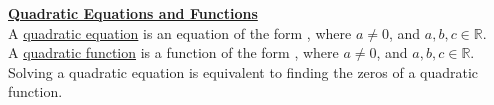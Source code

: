 \documentclass[11pt]{article}
\begin{document}
\noindent \underline{\textbf{Quadratic Equations and Functions}}\\[.15in]
A \underline{quadratic equation} is an equation of the form \lgblank, where $a\ne 0$, and $a, b, c \in \mathbb{R}$. \\[.15in]
A \underline{quadratic function} is a function of the form \lgblank, where $a\ne 0$, and $a, b, c \in \mathbb{R}$. \\[.15in]
Solving a quadratic equation is equivalent to finding the zeros of a quadratic function. \\[.15in]
\end{document}
